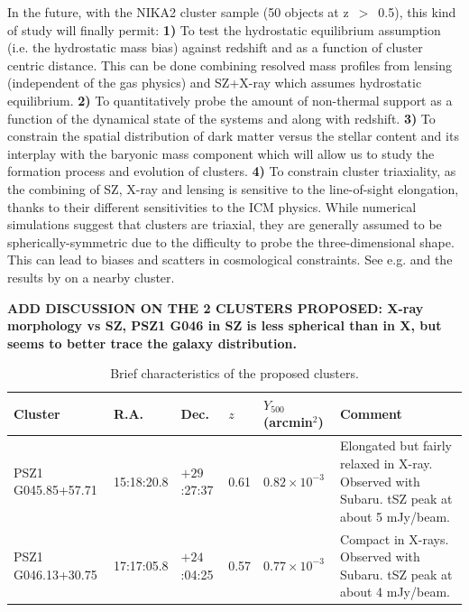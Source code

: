 \documentclass[11pt,a4paper,twoside,graphicx,color]{article}
\begin{document}
In the future, with the NIKA2 cluster sample (50 objects at z~$>$~0.5), this kind of study will finally permit: {\bf 1)} To test the hydrostatic equilibrium assumption (i.e. the hydrostatic mass bias) against redshift and as a function of cluster centric distance. This can be done combining resolved mass profiles from lensing (independent of the gas physics) and SZ+X-ray which assumes hydrostatic equilibrium. {\bf 2)} To quantitatively probe the amount of non-thermal support as a function of the dynamical state of the systems and along with redshift. {\bf 3)} To constrain the spatial distribution of dark matter versus the stellar content and its interplay with the baryonic mass component which will allow us to study the formation process and evolution of clusters. {\bf 4)} To constrain cluster triaxiality, as the combining of SZ, X-ray and lensing is sensitive to the line-of-sight elongation, thanks to their different sensitivities to the ICM physics. While numerical simulations suggest that clusters are triaxial, they are generally assumed to be spherically-symmetric due to the difficulty to probe the three-dimensional shape. This can lead to biases and scatters in cosmological constraints. See e.g. \cite{limousin2013} and the results by \cite{morandi2012} on a nearby cluster. 


{\bf ADD DISCUSSION ON THE 2 CLUSTERS PROPOSED: X-ray morphology vs SZ, PSZ1 G046 in SZ is less spherical than in X, but seems to better trace the galaxy distribution.}

\begin{table}
\begin{center}
\resizebox{\textwidth}{!} {
\begin{tabular}{|p{3.4cm}|p{1.6cm}|p{1.6cm}|p{0.6cm}|p{1.8cm}|p{7.3cm}|}
\hline
Cluster & R.A. & Dec. & $z$ & $Y_{500}$ (arcmin$^2$) & Comment \\
\hline
PSZ1 G045.85+57.71 & 15:18:20.8 & $+29$:27:37 & 0.61 & $0.82 \times 10^{-3}$& Elongated but fairly relaxed in \mbox{X-ray}. Observed with Subaru. tSZ peak at about 5 mJy/beam.\\
PSZ1 G046.13+30.75 & 17:17:05.8 & $+24$:04:25 & 0.57 & $0.77 \times 10^{-3}$ & Compact in X-rays. Observed with Subaru. tSZ peak at about 4 mJy/beam. \\
\hline
\end{tabular}
}
\end{center}
\caption{\footnotesize Brief characteristics of the proposed clusters. }
\label{tab:list_gc}
\end{table}
\end{document}
